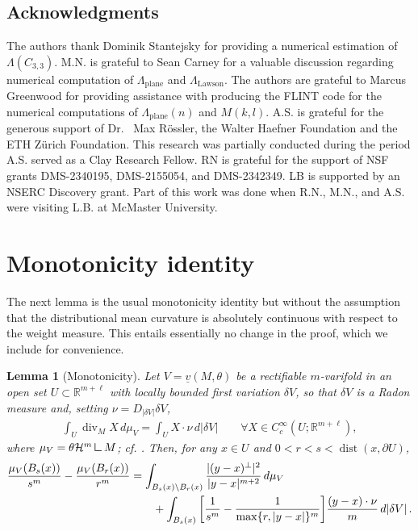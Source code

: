\documentclass[10pt,reqno]{amsart}
\numberwithin{equation}{section}
\newtheorem{lemma}[theorem]{Lemma}
\theoremstyle{definition}
\DeclareMathOperator{\dist}{dist}
\DeclareMathOperator{\Div}{div}
\newcommand{\mres}{\mathbin{\vrule height 1.6ex depth 0pt width
        0.13ex\vrule height 0.13ex depth 0pt width 1.3ex}}
\DeclareMathOperator{\Lawson}{Lawson}
\DeclareMathOperator{\plane}{plane}
\begin{document}
{{\subsection*{Acknowledgments} The authors thank Dominik Stantejsky for providing a numerical estimation of $\Lambda(C_{3,3})$. M.N. is grateful to Sean Carney for a valuable discussion regarding numerical computation of $\Lambda_{\plane}$ and $\Lambda_{\Lawson}$. The authors are grateful to Marcus Greenwood for providing assistance with producing the FLINT code for the numerical computations of $\Lambda_{\plane}(n)$ and $M(k,l)$. A.S. is grateful for the generous support of Dr.~ Max R\"ossler, the Walter Haefner Foundation and the ETH Z\"urich Foundation. This research was partially conducted during the period A.S. served as a Clay Research Fellow.
RN is grateful for the support of NSF grants DMS-2340195, DMS-2155054, and DMS-2342349. LB is supported by an NSERC Discovery grant. Part of this work was done when R.N., M.N., and A.S. were visiting L.B. at McMaster University.
\appendix


 
\section{Monotonicity identity}

The next lemma is the usual monotonicity identity but without the assumption that the distributional mean curvature is absolutely continuous with respect to the weight measure. This entails essentially no change in the proof, which we include for convenience.

\begin{lemma}[Monotonicity]\label{lemma:monotonicity}
    Let $V=\underline{v}(M,\theta)$ be a rectifiable $m$-varifold in an open set $U \subset \mathbb{R}^{m+\ell}$ with locally bounded first variation $\delta V$, so that $\delta V$ is a Radon measure and, setting $\nu = D_{|\delta V|}\delta V$, 
\begin{align}\label{eq:first variation}
    \int_{U} \Div_{M} X \, d\mu_V = \int_U X \cdot \nu\,d|\delta V|\qquad \forall X \in C_c^\infty(U;\mathbb{R}^{m+\ell}),
\end{align}
where $\mu_V = \theta \mathcal{H}^m \mres M$; cf. \cite[Chapter 8]{Sim83}. Then, for any $x\in U$ and $0<r<s<\dist(x,\partial U)$, 
\begin{align}\notag
\frac{\mu_V(B_s(x))}{s^m} - \frac{\mu_V(B_r(x))}{r^m} &= \int_{B_s(x) \setminus B_r(x)}\frac{|(y-x)^\perp|^2}{|y-x|^{m+2}}\,d\mu_V \\ \label{eq:monotonicity identity}
&\qquad + \int_{B_s(x)}\bigg[\frac{1}{s^m}-\frac{1}{\max\{r,|y-x|\}^m}\bigg]\frac{(y-x)\cdot \nu}{m}\,d|\delta V|\,.
\end{align}
\end{lemma}

}}
\end{document}
